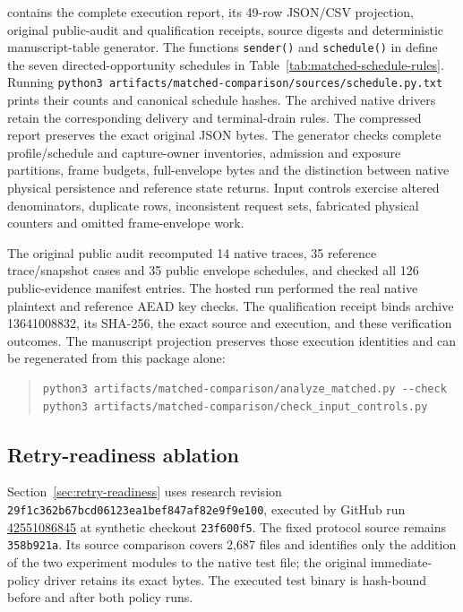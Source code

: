  contains the complete execution report,
its 49-row JSON/CSV projection, original public-audit and qualification
receipts, source digests and deterministic manuscript-table generator.
The functions \texttt{sender()} and \texttt{schedule()} in
 define the
seven directed-opportunity schedules in
Table~\ref{tab:matched-schedule-rules}. Running
\texttt{python3 artifacts/matched-comparison/sources/schedule.py.txt}
prints their counts and canonical schedule hashes. The archived native
drivers retain the corresponding delivery and terminal-drain rules.
The compressed report preserves the exact original JSON bytes. The generator
checks complete profile/schedule and capture-owner inventories, admission and
exposure partitions, frame budgets, full-envelope bytes and the distinction
between native physical persistence and reference state returns. Input
controls exercise altered denominators, duplicate rows, inconsistent request
sets, fabricated physical counters and omitted frame-envelope work.

The original public audit recomputed 14 native traces, 35 reference
trace/snapshot cases and 35 public envelope schedules, and checked all 126
public-evidence manifest entries. The hosted run performed the real native
plaintext and reference AEAD key checks. The qualification receipt
binds archive 13641008832, its SHA-256, the exact source and execution, and
these verification outcomes. The manuscript projection preserves those
execution identities and can be regenerated from this package alone:
\begin{samepage}
\begin{quote}
\small
\begin{verbatim}
python3 artifacts/matched-comparison/analyze_matched.py --check
python3 artifacts/matched-comparison/check_input_controls.py
\end{verbatim}
\end{quote}
\end{samepage}

\subsection{Retry-readiness ablation}
\label{app:retry-readiness}

Section~\ref{sec:retry-readiness} uses research revision
\texttt{29f1c362b67bcd06123ea1bef847af82e9f9e100}, executed by GitHub run
\href{https://github.com/billlza/q-periapt/actions/runs/42551086845}{42551086845}
at synthetic checkout \texttt{23f600f5}. The fixed protocol source remains
\texttt{358b921a}. Its source comparison covers 2,687 files and identifies
only the addition of the two experiment modules to the native test file;
the original immediate-policy driver retains its exact bytes. The executed
test binary is hash-bound before and after both policy runs.

